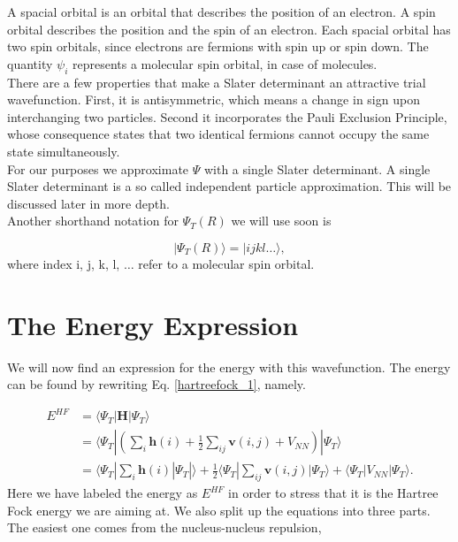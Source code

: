 \documentclass[a4paper,norsk,11pt,twoside]{report}
\begin{document}
A spacial orbital is an orbital that describes the position of an
electron. A spin orbital describes the position and the spin of an
electron. Each spacial orbital has two spin orbitals, since electrons
are fermions with spin up or spin down. The quantity $\psi_i$ represents a
molecular spin orbital, in case of molecules. \\

There are a few properties that make a Slater determinant an
attractive trial wavefunction. First, it is antisymmetric, which means
a change in sign upon interchanging two particles. Second it
incorporates the Pauli Exclusion Principle, whose consequence states
that two identical fermions cannot occupy the same state
simultaneously.  \\

For our purposes we approximate $\Psi$ with a single Slater
determinant. A single Slater determinant is a so called independent
particle approximation. This will be discussed later in more depth. \\

Another shorthand notation for $\Psi_T(R)$ we will use soon is

\begin{equation}
| \Psi_T(R) \rangle = |i j k l \dots \rangle, 
\label{hfnotat}
\end{equation}
where index i, j, k, l, $\dots$ refer to a molecular spin orbital.

\section{The Energy Expression}
We will now find an expression for the energy with this wavefunction. The energy can be found by rewriting Eq. \eqref{hartreefock_1}, namely. 

\begin{align}
E^{HF} & = \langle \Psi_T | \textbf{H} | \Psi_T \rangle \nonumber \\ &
= \langle \Psi_T | \left( \sum_i \textbf{h}(i) + \frac{1}{2} \sum_{ij} \textbf{v}(i,j) + V_{NN} \right) | \Psi_T \rangle \nonumber \\ &
= \langle \Psi_T | \sum_i \textbf{h}(i) | \Psi_T | \rangle
+ \frac{1}{2} \langle \Psi_T | \sum_{ij} \textbf{v}(i,j) | \Psi_T \rangle
+ \langle \Psi_T | V_{NN} | \Psi_T \rangle.
\label{hfref2}
\end{align}
Here we have labeled the energy  as $E^{HF}$ in order to stress that it is the Hartree Fock energy we are aiming at. 
We also split up the equations into three parts. The easiest one comes from the nucleus-nucleus repulsion,
\end{document}
